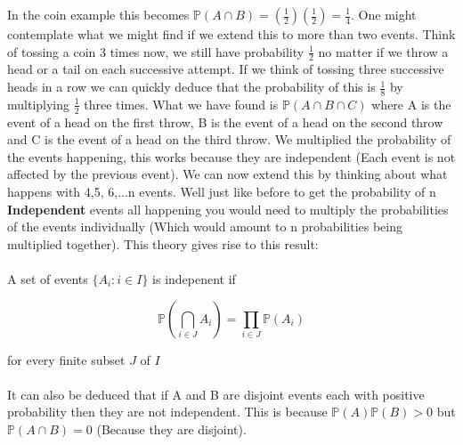 \documentclass[,oneside]{article}
\begin{document}
\begin{enumerate}
In the coin example this becomes $\mathbb{P}(A \cap B) = (\frac{1}{2})(\frac{1}{2})=\frac{1}{4}$. One might contemplate what we  might find if we extend this to more than two events. Think of tossing a coin 3 times now, we still have probability $\frac{1}{2}$ no matter if we throw a head or a tail on each successive attempt. If we think of tossing three successive heads in a row we can quickly deduce that the probability of this is $\frac{1}{8}$ by multiplying $\frac{1}{2}$ three times. What we have found is $\mathbb{P}(A \cap B \cap C)$ where A is the event of a head on the first throw, B is the event of a head on the second throw and C is the event of a head on the third throw. We multiplied the probability of the events happening, this works because they are independent (Each event is not affected by the previous event). We can now extend this by thinking about what happens with 4,5, 6,...n events. Well just like before to get the probability of n \textbf{Independent} events all happening you would need to multiply the probabilities of the events individually (Which would amount to n probabilities being multiplied together). This theory gives rise to this result:\\ \\
A set of events $\{A_i : i \in I\}$ is indepenent if
\begin{center}
 \[ \mathbb{P}\left(\bigcap_{i\in J} A_i\right) = \prod_{i\in J} \mathbb{P}\left(A_i  \right)\]
\end{center}
for every finite subset $J$ of $I$\\ \\
It can also be deduced that if A and B are disjoint events each with positive probability then they are not independent. This is because $\mathbb{P}(A)\mathbb{P}(B) > 0$ but $\mathbb{P}(A \cap B) = 0$ (Because they are disjoint).

\end{enumerate}
\end{document}
